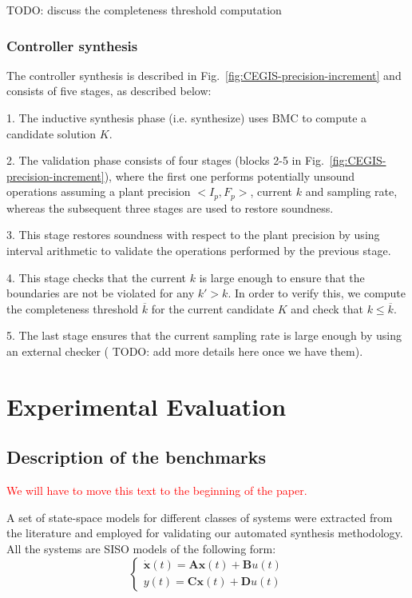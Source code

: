 \documentclass[runningheads,a4paper]{llncs}
\newcommand{\todo}[1]{{\color{red} TODO: #1}}
\begin{document}
\todo{discuss the completeness threshold computation}

\subsubsection{Controller synthesis}

The controller synthesis is described in Fig.~\ref{fig:CEGIS-precision-increment}
and consists of five stages, as described below:

1. The inductive synthesis phase (i.e. {\sc synthesize}) uses BMC to 
compute a candidate solution $K$. 

2. The validation phase consists of four stages 
(blocks 2-5 in Fig.~\ref{fig:CEGIS-precision-increment}), where the first one
performs potentially unsound
operations assuming a plant precision $<I_p,F_p>$, 
current $k$ and sampling rate, whereas the subsequent three stages are used to 
restore soundness. 

3. This stage restores soundness with respect to the plant precision
by using interval arithmetic \cite{moore1966interval} to validate the 
operations performed by the previous stage.

4. This stage checks that the current  $k$ 
is large enough to ensure that the boundaries are not be violated for any $k'>k$.
In order to verify this, we compute the 
completeness threshold $\overline{k}$ for the current candidate $K$ 
and check that $k{\leq}\overline{k}$. 

5. The last stage ensures that the current sampling rate is large enough by using an 
external checker (\todo{add more details here once we have them}).


\section{Experimental Evaluation}


\subsection{Description of the benchmarks}

\textcolor{red}{We will have to move this text to the beginning of the paper.}



A set of state-space models for different classes of systems were extracted from the literature and employed for validating our automated synthesis methodology. All the systems are SISO models of the following form:
\begin{equation}
\left\lbrace\begin{array}{c}
\dot{\textbf{x}}(t)=\textbf{A}\textbf{x}(t)+\textbf{B}u(t)\\
y(t)=\textbf{C}\textbf{x}(t)+\textbf{D}u(t)
\end{array}\right.
\end{equation}
\end{document}
